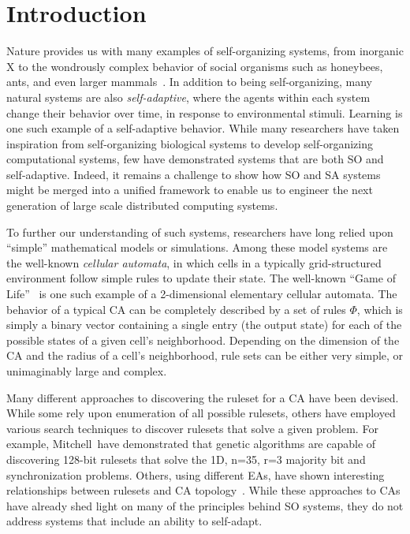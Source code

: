 \section{Introduction}\label{s:intro}

Nature provides us with many examples of self-organizing systems, from inorganic X to the wondrously complex behavior of social organisms such as honeybees, ants, and even larger mammals~\cite{?}.  In addition to being self-organizing, many natural systems are also {\em self-adaptive}, where the agents within each system change their behavior over time, in response to environmental stimuli.  Learning is one such example of a self-adaptive behavior.  While many researchers have taken inspiration from self-organizing biological systems to develop self-organizing computational systems, few have demonstrated systems that are both SO and self-adaptive.  Indeed, it remains a challenge to show how SO and SA systems might be merged into a unified framework to enable us to engineer the next generation of large scale distributed computing systems.

To further our understanding of such systems, researchers have long relied upon ``simple'' mathematical models or simulations.  Among these model systems are the well-known {\em cellular automata}, in which cells in a typically grid-structured environment follow simple rules to update their state.  The well-known ``Game of Life''~\cite{conway} is one such example of a 2-dimensional elementary cellular automata.  The behavior of a typical CA can be completely described by a set of rules $\Phi$, which is simply a binary vector containing a single entry (the output state) for each of the possible states of a given cell's neighborhood.  Depending on the dimension of the CA and the radius of a cell's neighborhood, rule sets can be either very simple, or unimaginably large and complex.

Many different approaches to discovering the ruleset for a CA have been devised.  While some rely upon enumeration of all possible rulesets, others have employed various search techniques to discover rulesets that solve a given problem.  For example, Mitchell~\etal have demonstrated that genetic algorithms are capable of discovering 128-bit rulesets that solve the 1D, n=35, r=3 majority bit and synchronization problems.  Others, using different EAs, have shown interesting relationships between rulesets and CA topology~\cite{?}.  While these approaches to CAs have already shed light on many of the principles behind SO systems, they do not address systems that include an ability to self-adapt.

